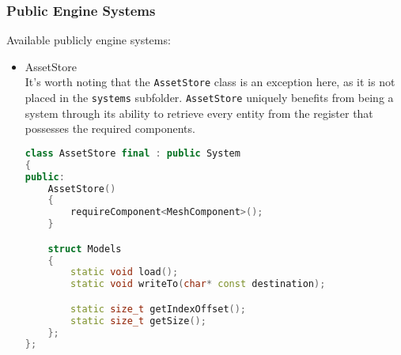 \subsubsection{Public Engine Systems}
Available publicly engine systems:
\begin{itemize}
    \item AssetStore\\
    It's worth noting that the \texttt{AssetStore} class is an exception here, as it is not placed in the \texttt{systems} subfolder. \texttt{AssetStore} uniquely benefits from being a system through its ability to retrieve every entity from the register that possesses the required components.
\begin{lstlisting}[language=c++, caption=\texttt{AssetStore} class (./engine/include/tsengine/asset\_store.h)]
class AssetStore final : public System
{
public:
    AssetStore()
    {
        requireComponent<MeshComponent>();
    }

    struct Models
    {
        static void load();
        static void writeTo(char* const destination);

        static size_t getIndexOffset();
        static size_t getSize();
    };
};
\end{lstlisting}    
\end{itemize}

